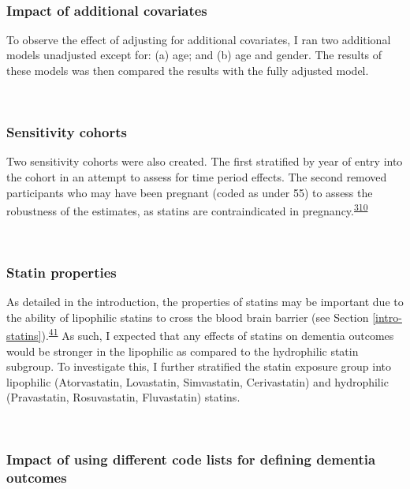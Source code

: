 \documentclass[a4paper, twoside]{templates/ociamthesis}
\begin{document}
~

\hypertarget{impact-of-additional-covariates}{%
\subsubsection{Impact of additional covariates}\label{impact-of-additional-covariates}}

To observe the effect of adjusting for additional covariates, I ran two additional models unadjusted except for: (a) age; and (b) age and gender. The results of these models was then compared the results with the fully adjusted model.

~

\hypertarget{sensitivity-cohorts}{%
\subsubsection{Sensitivity cohorts}\label{sensitivity-cohorts}}

Two sensitivity cohorts were also created. The first stratified by year of entry into the cohort in an attempt to assess for time period effects. The second removed participants who may have been pregnant (coded as under 55) to assess the robustness of the estimates, as statins are contraindicated in pregnancy.\textsuperscript{\protect\hyperlink{ref-karalis2016}{310}}

~

\hypertarget{statin-properties}{%
\subsubsection{Statin properties}\label{statin-properties}}

As detailed in the introduction, the properties of statins may be important due to the ability of lipophilic statins to cross the blood brain barrier (see Section \ref{intro-statins}).\textsuperscript{\protect\hyperlink{ref-sierra2011}{41}} As such, I expected that any effects of statins on dementia outcomes would be stronger in the lipophilic as compared to the hydrophilic statin subgroup. To investigate this, I further stratified the statin exposure group into lipophilic (Atorvastatin, Lovastatin, Simvastatin, Cerivastatin) and hydrophilic (Pravastatin, Rosuvastatin, Fluvastatin) statins.

~

\hypertarget{impact-of-using-different-code-lists-for-defining-dementia-outcomes}{%
\subsubsection{Impact of using different code lists for defining dementia outcomes}\label{impact-of-using-different-code-lists-for-defining-dementia-outcomes}}
\end{document}
